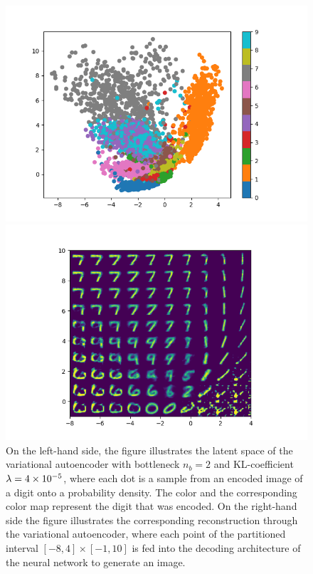\begin{figure}
\begin{center}
   \begin{minipage}[b]{0.49\linewidth}
      \includegraphics[trim = 15mm 5mm 15mm 10mm, clip, width=\linewidth]{convolutional_VAE_snd_KL_4e-5_10k_epochs_2D_latent}
	\end{minipage}
   \begin{minipage}[b]{0.49\linewidth}
      \includegraphics[trim = 15mm 5mm 15mm 10mm, clip, width=\linewidth]{convolutional_VAE_snd_KL_4e-5_10k_epochs_2D_reconstruction}
	\end{minipage}
\end{center}
\caption{On the left-hand side, the figure illustrates the latent space of the variational autoencoder with bottleneck $n_b=2$ and KL-coefficient $\lambda = \num{4e-5}$, where each dot is a sample from an encoded image of a digit onto a probability density. The color and the corresponding color map represent the digit that was encoded. On the right-hand side the figure illustrates the corresponding reconstruction through the variational autoencoder, where each point of the partitioned  interval $[-8, 4]\times [-1, 10]$ is fed into the decoding architecture of the neural network to generate an image.}\label{fig:convolutional_VAE_snd_KL_4e-5_10k_epochs_2D}
\end{figure}


